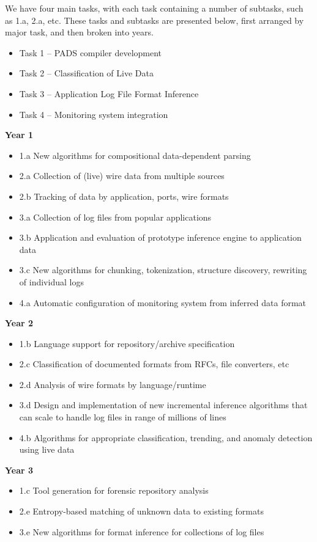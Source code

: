 We have four main tasks, with each task containing a number of
subtasks, such as 1.a, 2.a, etc.  These tasks and subtasks are
presented below, first arranged by major task, and then broken into
years.

\begin{itemize}
\item Task 1 -- PADS compiler development
\item Task 2 -- Classification of Live Data
\item Task 3 -- Application Log File Format Inference
\item Task 4 -- Monitoring system integration
\end{itemize}


\noindent
{\bf Year 1}
\begin{itemize}
\item 1.a New algorithms for compositional data-dependent parsing
\item 2.a Collection of (live) wire data from multiple sources
\item 2.b Tracking of data by application, ports, wire formats
\item 3.a Collection of log files from popular applications
\item 3.b Application and evaluation of prototype inference engine to application data
\item 3.c New algorithms for chunking, tokenization, structure discovery, rewriting of individual logs
\item 4.a Automatic configuration of monitoring system from inferred data format
\end{itemize}

\noindent
{\bf Year 2}
\begin{itemize}
\item 1.b Language support for repository/archive specification
\item 2.c Classification of documented formats from RFCs, file converters, etc
\item 2.d Analysis of wire formats by language/runtime 
\item 3.d Design and implementation of new incremental inference algorithms that can scale to handle log files in range of millions of lines
\item 4.b Algorithms for appropriate classification, trending, and anomaly detection using live data
\end{itemize}

\noindent
{\bf Year 3}
\begin{itemize}
\item 1.c Tool generation for forensic repository analysis
\item 2.e Entropy-based matching of unknown data to existing formats
\item 3.e New algorithms for format inference for collections of log files
\end{itemize}


